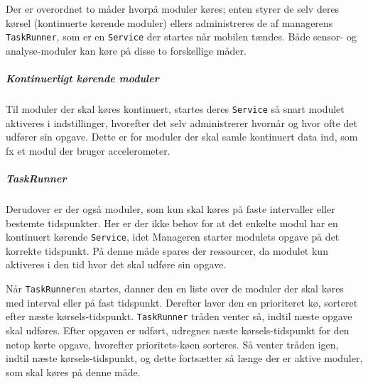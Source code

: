 Der er overordnet to måder hvorpå moduler køres; enten styrer de selv deres kørsel (kontinuerte kørende moduler) ellers administreres de af managerens \texttt{TaskRunner}, som er en \texttt{Service} der startes når mobilen tændes.
Både sensor- og analyse-moduler kan køre på disse to forskellige måder.

\subparagraph{Kontinuerligt kørende moduler}
Til moduler der skal køres kontinuert, startes deres \texttt{Service} så snart modulet aktiveres i indstillinger, hvorefter det selv administrerer hvornår og hvor ofte det udfører sin opgave.
Dette er for moduler der skal samle kontinuert data ind, som fx et modul der bruger accelerometer.

\subparagraph{TaskRunner}
Derudover er der også moduler, som kun skal køres på faste intervaller eller bestemte tidspunkter.
Her er der ikke behov for at det enkelte modul har en kontinuert kørende \texttt{Service}, idet Manageren starter modulets opgave på det korrekte tidspunkt.
På denne måde spares der ressourcer, da modulet kun aktiveres i den tid hvor det skal udføre sin opgave. 

Når \texttt{TaskRunner}en startes, danner den en liste over de moduler der skal køres med interval eller på fast tidspunkt.
Derefter laver den en prioriteret kø, sorteret efter næste kørsels-tidspunkt.
\texttt{TaskRunner} tråden venter så, indtil næste opgave skal udføres.
Efter opgaven er udført, udregnes næste kørsels-tidspunkt for den netop kørte opgave, hvorefter prioritets-køen sorteres.
Så venter tråden igen, indtil næste kørsels-tidspunkt, og dette fortsætter så længe der er aktive moduler, som skal køres på denne måde.
